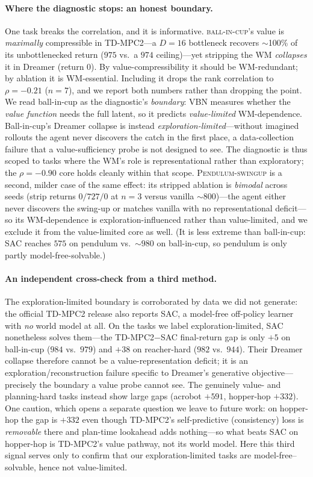 \documentclass[letterpaper]{article}
\begin{document}
\paragraph{Where the diagnostic stops: an honest boundary.}
One task breaks the correlation, and it is informative. \textsc{ball-in-cup}'s
value is \emph{maximally} compressible in TD-MPC2---a $D{=}16$ bottleneck
recovers $\sim$100\% of its unbottlenecked return ($975$ vs.\ a $974$
ceiling)---yet stripping the WM \emph{collapses} it in Dreamer (return $0$).
By value-compressibility it should be WM-redundant; by ablation it is
WM-essential. Including it drops the rank correlation to $\rho{=}{-}0.21$
($n{=}7$), and we report both numbers rather than dropping the point. We read
ball-in-cup as the diagnostic's \emph{boundary}: VBN measures whether the
\emph{value function} needs the full latent, so it predicts
\emph{value-limited} WM-dependence. Ball-in-cup's Dreamer collapse is instead
\emph{exploration-limited}---without imagined rollouts the agent never
discovers the catch in the first place, a data-collection failure that a
value-sufficiency probe is not designed to see. The diagnostic is thus scoped
to tasks where the WM's role is representational rather than exploratory; the
$\rho{=}{-}0.90$ core holds cleanly within that scope.
\textsc{Pendulum-swingup} is a second, milder case of the same effect: its
stripped ablation is \emph{bimodal} across seeds (strip returns $0/727/0$ at
$n{=}3$ versus vanilla $\sim$$800$)---the agent either never discovers the
swing-up or matches vanilla with no representational deficit---so its
WM-dependence is exploration-influenced rather than value-limited, and we
exclude it from the value-limited core as well. (It is less extreme than
ball-in-cup: SAC reaches $575$ on pendulum vs.\ $\sim$$980$ on ball-in-cup,
so pendulum is only partly model-free-solvable.)

\paragraph{An independent cross-check from a third method.}
The exploration-limited boundary is corroborated by data we did not generate:
the official TD-MPC2 release \cite{hansen2024tdmpc2} also reports SAC, a
model-free off-policy learner with \emph{no} world model at all. On the tasks
we label exploration-limited, SAC nonetheless solves them---the
TD-MPC2$-$SAC final-return gap is only $+5$ on ball-in-cup ($984$ vs.\ $979$)
and $+38$ on reacher-hard ($982$ vs.\ $944$). Their Dreamer collapse therefore
cannot be a value-representation deficit; it is an exploration/reconstruction
failure specific to Dreamer's generative objective---precisely the boundary a
value probe cannot see. The genuinely value- and planning-hard tasks instead
show large gaps (acrobot $+591$, hopper-hop $+332$). One caution, which opens a
separate question we leave to future work: on hopper-hop the gap is $+332$ even
though TD-MPC2's self-predictive (consistency) loss is \emph{removable} there
and plan-time lookahead adds nothing---so what beats SAC on hopper-hop is
TD-MPC2's value pathway, not its world model. Here this third signal serves
only to confirm that our exploration-limited tasks are model-free--solvable,
hence not value-limited.
\end{document}
